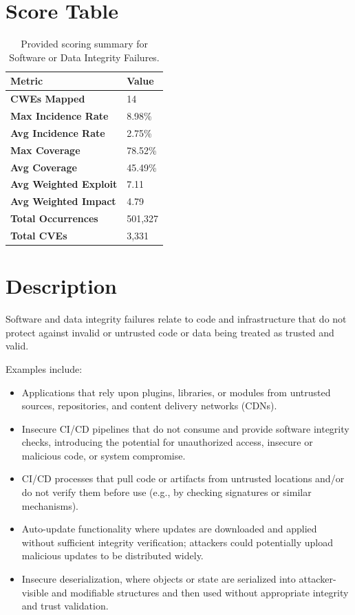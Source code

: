 \documentclass[11pt]{article}
\begin{document}
\section{Score Table}
\begin{table}[h!]
\centering
\renewcommand{\arraystretch}{1.2}
\begin{tabular}{@{}>{\bfseries}p{4.9cm}p{3.1cm}@{}}
\toprule
Metric & Value \\
\midrule
CWEs Mapped & 14 \\
Max Incidence Rate & 8.98\% \\
Avg Incidence Rate & 2.75\% \\
Max Coverage & 78.52\% \\
Avg Coverage & 45.49\% \\
Avg Weighted Exploit & 7.11 \\
Avg Weighted Impact & 4.79 \\
Total Occurrences & 501{,}327 \\
Total CVEs & 3{,}331 \\
\bottomrule
\end{tabular}
\caption{Provided scoring summary for Software or Data Integrity Failures.}
\end{table}

\section{Description}
Software and data integrity failures relate to code and infrastructure that do not protect against invalid or untrusted code or data being treated as trusted and valid.

Examples include:
\begin{itemize}
  \item Applications that rely upon plugins, libraries, or modules from untrusted sources, repositories, and content delivery networks (CDNs).
  \item Insecure CI/CD pipelines that do not consume and provide software integrity checks, introducing the potential for unauthorized access, insecure or malicious code, or system compromise.
  \item CI/CD processes that pull code or artifacts from untrusted locations and/or do not verify them before use (e.g., by checking signatures or similar mechanisms).
  \item Auto-update functionality where updates are downloaded and applied without sufficient integrity verification; attackers could potentially upload malicious updates to be distributed widely.
  \item Insecure deserialization, where objects or state are serialized into attacker-visible and modifiable structures and then used without appropriate integrity and trust validation.
\end{itemize}
\end{document}
